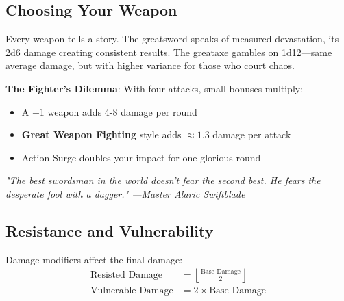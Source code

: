 \documentclass[11pt,letterpaper,openany]{book}
\newcommand{\fantasyquote}[1]{%
\begin{center}
\textit{\large #1}
\end{center}
}
\newcommand{\ability}[1]{\textcolor{dragongreen}{\textbf{#1}}}
\begin{document}
\subsection{Choosing Your Weapon}

Every weapon tells a story. The greatsword speaks of measured devastation, its 2d6 damage creating consistent results. The greataxe gambles on 1d12—same average damage, but with higher variance for those who court chaos.

\textbf{The Fighter's Dilemma}: With four attacks, small bonuses multiply:
\begin{itemize}
    \item A +1 weapon adds 4-8 damage per round
    \item \ability{Great Weapon Fighting} style adds $\approx 1.3$ damage per attack
    \item Action Surge doubles your impact for one glorious round
\end{itemize}

\fantasyquote{"The best swordsman in the world doesn't fear the second best. He fears the desperate fool with a dagger." —Master Alaric Swiftblade}

\subsection{Resistance and Vulnerability}

Damage modifiers affect the final damage:
\begin{align}
\text{Resisted Damage} &= \left\lfloor \frac{\text{Base Damage}}{2} \right\rfloor \\
\text{Vulnerable Damage} &= 2 \times \text{Base Damage}
\end{align}
\end{document}
